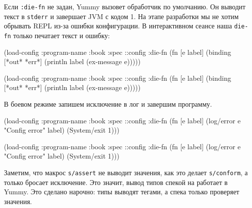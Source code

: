 
Если \verb|:die-fn| не задан, Yummy вызовет обработчик по умолчанию. Он
выводит текст в \verb|stderr| и завершает JVM с кодом 1. На этапе разработки
мы не хотим обрывать REPL из-за ошибки конфигурации. В интерактивном сеансе
наша \verb|die-fn| только печатает текст и ошибку:

\ifx\DEVICETYPE\MOBILE

\begin{english}
  \begin{clojure}
(load-config
 {:program-name :book
  :spec ::config
  :die-fn (fn [e label]
            (binding [*out* *err*]
              (println label
                (ex-message e))))})
  \end{clojure}
\end{english}

\else

\begin{english}
  \begin{clojure}
(load-config
 {:program-name :book
  :spec ::config
  :die-fn (fn [e label]
            (binding [*out* *err*]
              (println label (ex-message e))))})
  \end{clojure}
\end{english}

\fi

\noindent
В боевом режиме запишем исключение в лог и завершим программу.


\ifx\DEVICETYPE\MOBILE

\begin{english}
  \begin{clojure}
(load-config
 {:program-name :book
  :spec ::config
  :die-fn (fn [e label]
            (log/error e
              "Config error" label)
            (System/exit 1))})
  \end{clojure}
\end{english}

\else

\begin{english}
  \begin{clojure}
(load-config
 {:program-name :book
  :spec ::config
  :die-fn (fn [e label]
            (log/error e "Config error" label)
            (System/exit 1))})
  \end{clojure}
\end{english}

\fi

Заметим, что макрос \verb|s/assert| не выводит значения, как это делает
\verb|s/conform|, а только бросает исключение. Это значит, вывод типов спекой на
работает в Yummy. Это сделано нарочно: типы выводят тегами, а спека только
проверяет значения.

